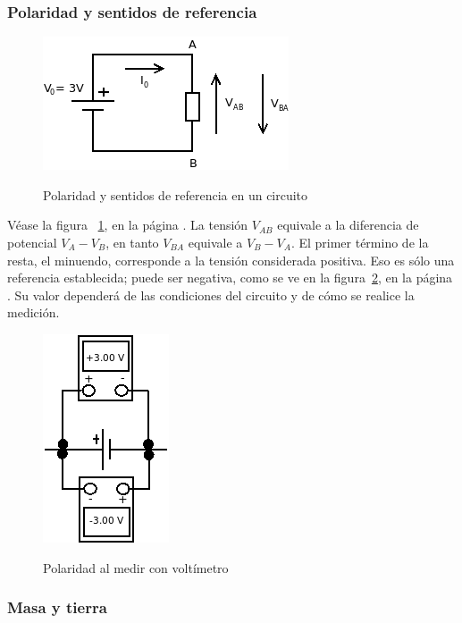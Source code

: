 \documentclass{article}
\begin{document}
\subsubsection{Polaridad y sentidos de referencia}

\begin{figure}[t]
\caption{Polaridad y sentidos de referencia en un circuito}
\includegraphics[scale=1]{img/teo_fig002_polaridad.png} 
\centering
\label{fig:002_polaridad}
\end{figure}

Véase la figura ~\ref{fig:002_polaridad}, en la página \pageref{fig:002_polaridad}. La tensión $V_{AB}$ equivale a la diferencia
de potencial $V_A - V_B$, en tanto $V_{BA}$ equivale a $V_B - V_A$. El primer término de la resta, el minuendo, corresponde
a la tensión considerada positiva. Eso es sólo una referencia establecida; puede ser negativa, como se ve en la
figura~\ref{fig:003_voltimetro}, en la página \pageref{fig:003_voltimetro}. Su valor dependerá de las condiciones del
circuito y de cómo se realice la medición.

\begin{figure}[t]
\caption{Polaridad al medir con voltímetro}
\includegraphics[scale=0.75]{img/teo_fig003_voltimetro.png} 
\centering
\label{fig:003_voltimetro}
\end{figure}

\subsubsection{Masa y tierra}
\end{document}
